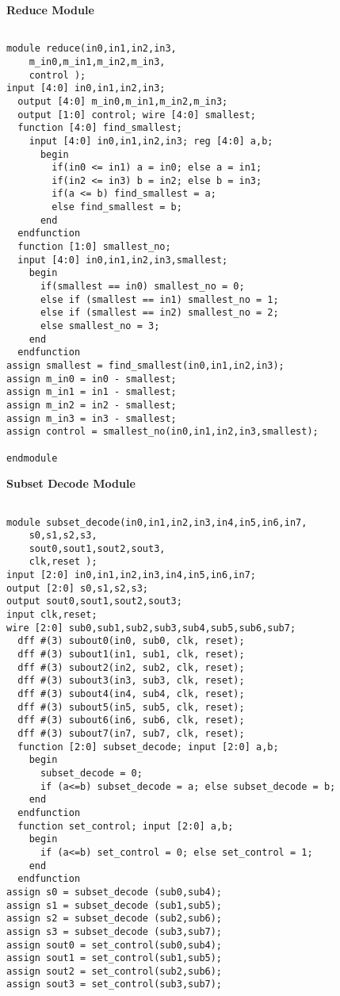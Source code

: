 \documentclass[14pt]{report}
\begin{document}
{\begin{verbatim}
\end{verbatim}
\textbf{Reduce Module}\\
\begin{verbatim}

module reduce(in0,in1,in2,in3,
    m_in0,m_in1,m_in2,m_in3,
    control );
input [4:0] in0,in1,in2,in3;
  output [4:0] m_in0,m_in1,m_in2,m_in3;
  output [1:0] control; wire [4:0] smallest;
  function [4:0] find_smallest;
    input [4:0] in0,in1,in2,in3; reg [4:0] a,b;
      begin
        if(in0 <= in1) a = in0; else a = in1;
        if(in2 <= in3) b = in2; else b = in3;
        if(a <= b) find_smallest = a;
        else find_smallest = b;
      end
  endfunction
  function [1:0] smallest_no;
  input [4:0] in0,in1,in2,in3,smallest;
    begin
      if(smallest == in0) smallest_no = 0;
      else if (smallest == in1) smallest_no = 1;
      else if (smallest == in2) smallest_no = 2;
      else smallest_no = 3;
    end
  endfunction
assign smallest = find_smallest(in0,in1,in2,in3);
assign m_in0 = in0 - smallest;
assign m_in1 = in1 - smallest;
assign m_in2 = in2 - smallest;
assign m_in3 = in3 - smallest;
assign control = smallest_no(in0,in1,in2,in3,smallest);

endmodule

\end{verbatim}
\textbf{Subset Decode Module}\\
\begin{verbatim}

module subset_decode(in0,in1,in2,in3,in4,in5,in6,in7,
    s0,s1,s2,s3,
    sout0,sout1,sout2,sout3,
    clk,reset );
input [2:0] in0,in1,in2,in3,in4,in5,in6,in7;
output [2:0] s0,s1,s2,s3;
output sout0,sout1,sout2,sout3;
input clk,reset;
wire [2:0] sub0,sub1,sub2,sub3,sub4,sub5,sub6,sub7;
  dff #(3) subout0(in0, sub0, clk, reset);
  dff #(3) subout1(in1, sub1, clk, reset);
  dff #(3) subout2(in2, sub2, clk, reset);
  dff #(3) subout3(in3, sub3, clk, reset);
  dff #(3) subout4(in4, sub4, clk, reset);
  dff #(3) subout5(in5, sub5, clk, reset);
  dff #(3) subout6(in6, sub6, clk, reset);
  dff #(3) subout7(in7, sub7, clk, reset);
  function [2:0] subset_decode; input [2:0] a,b;
    begin
      subset_decode = 0;
      if (a<=b) subset_decode = a; else subset_decode = b;
    end
  endfunction
  function set_control; input [2:0] a,b;
    begin
      if (a<=b) set_control = 0; else set_control = 1;
    end
  endfunction
assign s0 = subset_decode (sub0,sub4);
assign s1 = subset_decode (sub1,sub5);
assign s2 = subset_decode (sub2,sub6);
assign s3 = subset_decode (sub3,sub7);
assign sout0 = set_control(sub0,sub4);
assign sout1 = set_control(sub1,sub5);
assign sout2 = set_control(sub2,sub6);
assign sout3 = set_control(sub3,sub7);


\end{verbatim}}
\end{document}
